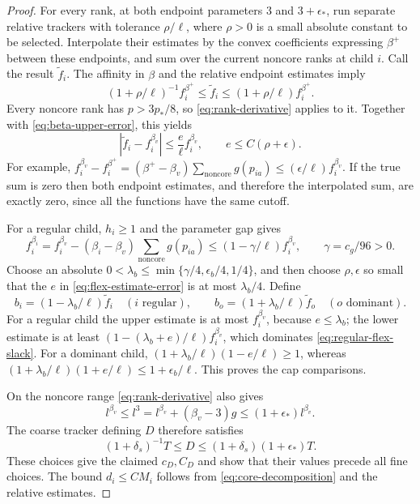 \begin{proof}
For every rank, at both endpoint parameters $3$ and $3+\epsilon_*$,
run separate relative trackers with tolerance $\rho/\ell$, where
$\rho>0$ is a small absolute constant to be selected.
Interpolate their estimates by the convex coefficients expressing
$\beta^+$ between these endpoints, and sum over the current noncore
ranks at child $i$.  Call the result $\widetilde f_i$.
The affinity in $\beta$ and the relative endpoint estimates imply
\[
 (1+\rho/\ell)^{-1} f_i^{\beta^+}
       \le\widetilde f_i\le(1+\rho/\ell)f_i^{\beta^+}.
\]
Every noncore rank has $p>3p_*/8$, so
\eqref{eq:rank-derivative} applies to it.  Together with
\eqref{eq:beta-upper-error}, this yields
\begin{equation}\label{eq:flex-estimate-error}
       |\widetilde f_i-f_i^{\beta_v}|
          \le\frac{e}{\ell}f_i^{\beta_v},\qquad
                      e\le C(\rho+\epsilon).
\end{equation}
For example,
$f_i^{\beta_v}-f_i^{\beta^+}
=(\beta^+-\beta_v)\sum_{\mathrm{noncore}}g(p_{ia})
\le(\epsilon/\ell)f_i^{\beta_v}$.
If the true sum is zero then both endpoint estimates, and therefore
the interpolated sum, are exactly zero, since all the functions have
the same cutoff.

For a regular child, $h_i\ge1$ and the parameter gap gives
\begin{equation}\label{eq:regular-flex-slack}
 f_i^{\beta_i}
 =f_i^{\beta_v}-(\beta_i-\beta_v)
                  \sum_{\mathrm{noncore}}g(p_{ia})
 \le(1-\gamma/\ell)f_i^{\beta_v},
             \qquad \gamma=c_g/96>0.
\end{equation}
Choose an absolute
$0<\lambda_b\le\min\{\gamma/4,\epsilon_b/4,1/4\}$,
and then choose $\rho,\epsilon$ so small that the $e$ in
\eqref{eq:flex-estimate-error} is at most $\lambda_b/4$.
Define
\[
 b_i=(1-\lambda_b/\ell)\widetilde f_i\quad(i\text{ regular}),
 \qquad
 b_o=(1+\lambda_b/\ell)\widetilde f_o\quad(o\text{ dominant}).
\]
For a regular child the upper estimate is at most $f_i^{\beta_v}$,
because $e\le\lambda_b$; the lower estimate is at least
$(1-(\lambda_b+e)/\ell)f_i^{\beta_v}$, which dominates
\eqref{eq:regular-flex-slack}.  For a dominant child,
$(1+\lambda_b/\ell)(1-e/\ell)\ge1$, whereas
$(1+\lambda_b/\ell)(1+e/\ell)\le1+\epsilon_b/\ell$.
This proves the cap comparisons.

On the noncore range \eqref{eq:rank-derivative} also gives
\[
 l^{\beta_v}\le l^3
       =l^{\beta_v}+(\beta_v-3)g
       \le(1+\epsilon_*)l^{\beta_v}.
\]
The coarse tracker defining $D$ therefore satisfies
\[
 (1+\delta_s)^{-1}T\le D
       \le(1+\delta_s)(1+\epsilon_*)T.
\]
These choices give the claimed $c_D,C_D$ and show that their values
precede all fine choices.  The bound $d_i\le C M_i$ follows from
\eqref{eq:core-decomposition} and the relative estimates.


\end{proof}
